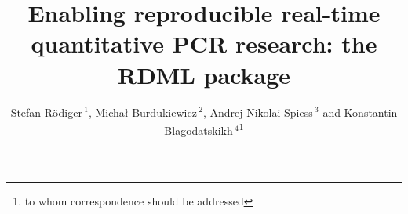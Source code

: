 \documentclass{bioinfo}
\begin{document}
\title[RDML]{Enabling reproducible real-time quantitative PCR research: the RDML package}
\author[Blagodatskikh \textit{et~al}]{Stefan R\"{o}diger\,$^{1}$, Micha\l{} Burdukiewicz\,$^{2}$, Andrej-Nikolai Spiess\,$^{3}$ and Konstantin Blagodatskikh\,$^{4}$\footnote{to whom correspondence should be addressed}} 

\address{
$^{1}$Institute of Biotechnology, Brandenburg University of Technology Cottbus--Senftenberg, Senftenberg, Germany\\ 
$^{2}$Department of Genomics, Faculty of Biotechnology, University of Wroc\l{}aw, Wroc\l{}aw\\
$^{3}$University Medical Center Hamburg-Eppendorf, Hamburg, Germany\\
$^{4}$Evrogen JSC, Moscow, Russia\\ 
}

\maketitle
\end{document}

